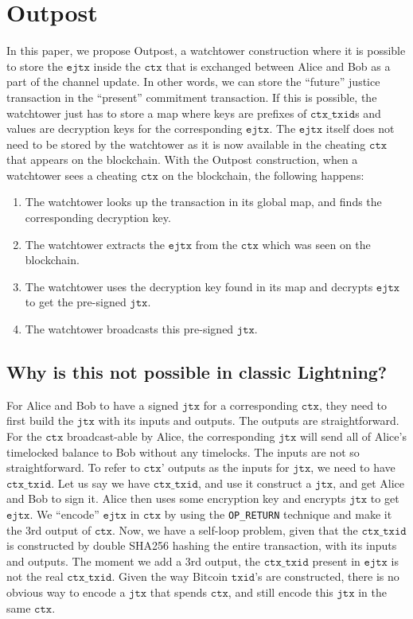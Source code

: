 \section{Outpost} %
In this paper, we propose Outpost, a watchtower construction where it is possible to store the $\texttt{ejtx}$ inside the $\texttt{ctx}$ that is exchanged between Alice and Bob as a part of the channel update. In other words, we can store the ``future'' justice transaction in the ``present'' commitment transaction. If this is possible, the watchtower just has to store a map where keys are prefixes of $\texttt{ctx\_txid}$s and values are decryption keys for the corresponding $\texttt{ejtx}$. The $\texttt{ejtx}$ itself does not need to be stored by the watchtower as it is now available in the cheating $\texttt{ctx}$ that appears on the blockchain. With the Outpost construction, when a watchtower sees a cheating $\texttt{ctx}$ on the blockchain, the following happens:
\begin{enumerate}
\item The watchtower looks up the transaction in its global map, and finds the corresponding decryption key.
\item The watchtower extracts the $\texttt{ejtx}$ from the $\texttt{ctx}$ which was seen on the blockchain.
\item The watchtower uses the decryption key found in its map and decrypts $\texttt{ejtx}$ to get the pre-signed $\texttt{jtx}$.
\item The watchtower broadcasts this pre-signed $\texttt{jtx}$.
\end{enumerate}

\subsection{Why is this not possible in classic Lightning?}

For Alice and Bob to have a signed $\texttt{jtx}$ for a corresponding $\texttt{ctx}$, they need to first build the $\texttt{jtx}$ with its inputs and outputs. The outputs are straightforward. For the $\texttt{ctx}$ broadcast-able by Alice, the corresponding $\texttt{jtx}$ will send all of Alice's timelocked balance to Bob without any timelocks. The inputs are not so straightforward. To refer to $\texttt{ctx}$' outputs as the inputs for $\texttt{jtx}$, we need to have $\texttt{ctx\_txid}$. Let us say we have $\texttt{ctx\_txid}$, and use it construct a $\texttt{jtx}$, and get Alice and Bob to sign it. Alice then uses some encryption key and encrypts $\texttt{jtx}$ to get $\texttt{ejtx}$. We ``encode'' $\texttt{ejtx}$ in $\texttt{ctx}$ by using the \texttt{OP\_RETURN} technique and make it the 3rd output of $\texttt{ctx}$. Now, we have a self-loop problem, given that the $\texttt{ctx\_txid}$ is constructed by double SHA256 hashing the entire transaction, with its inputs and outputs. The moment we add a 3rd output, the $\texttt{ctx\_txid}$ present in $\texttt{ejtx}$ is not the real $\texttt{ctx\_txid}$. Given the way Bitcoin $\texttt{txid}$'s are constructed, there is no obvious way to encode a $\texttt{jtx}$ that spends $\texttt{ctx}$, and still encode this $\texttt{jtx}$ in the same $\texttt{ctx}$.

